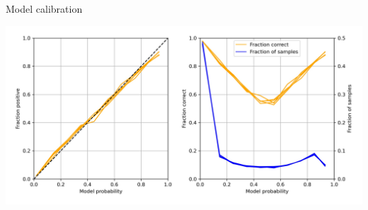\begin{frame}{Model calibration}


\begin{center}
\includegraphics[width=1.0\textwidth]{./images/02_xgb_10_features_reliability}
\end{center}


\end{frame}